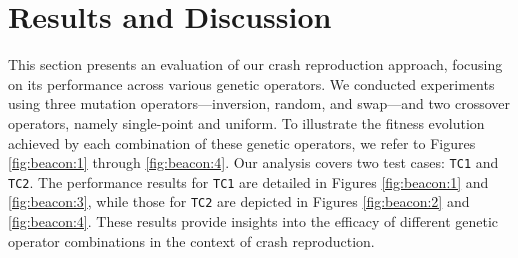 \section{Results and Discussion}
\label{sec:results}
    This section presents an evaluation of our crash reproduction approach, focusing on its performance across various 
    genetic operators. We conducted experiments using three mutation operators—inversion, random, and swap—and two 
    crossover operators, namely single-point and uniform. To illustrate the fitness evolution achieved by each 
    combination of these genetic operators, we refer to Figures \ref{fig:beacon:1} through \ref{fig:beacon:4}. Our 
    analysis covers two test cases: \texttt{TC1} and \texttt{TC2}. The performance results for \texttt{TC1} are detailed 
    in Figures \ref{fig:beacon:1} and \ref{fig:beacon:3}, while those for \texttt{TC2} are depicted in Figures 
    \ref{fig:beacon:2} and \ref{fig:beacon:4}. These results provide insights into the efficacy of different genetic 
    operator combinations in the context of crash reproduction.

